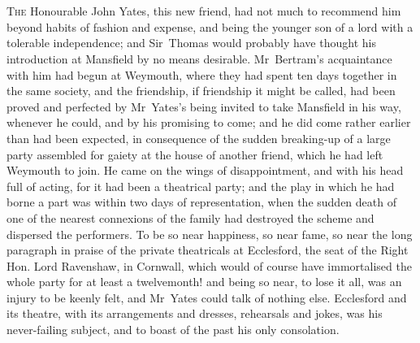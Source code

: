 \chapter[Chapter \thechapter]{} 

 \lettrine[lraise=0.3]{T}{he} Honourable John Yates, this new friend, had not much to recommend him beyond habits of fashion and expense, and being the younger son of a lord with a tolerable independence; and Sir~Thomas would probably have thought his introduction at Mansfield by no means desirable. Mr~Bertram's acquaintance with him had begun at Weymouth, where they had spent ten days together in the same society, and the friendship, if friendship it might be called, had been proved and perfected by Mr~Yates's being invited to take Mansfield in his way, whenever he could, and by his promising to come; and he did come rather earlier than had been expected, in consequence of the sudden breaking-up of a large party assembled for gaiety at the house of another friend, which he had left Weymouth to join. He came on the wings of disappointment, and with his head full of acting, for it had been a theatrical party; and the play in which he had borne a part was within two days of representation, when the sudden death of one of the nearest connexions of the family had destroyed the scheme and dispersed the performers. To be so near happiness, so near fame, so near the long paragraph in praise of the private theatricals at Ecclesford, the seat of the Right Hon. Lord Ravenshaw, in Cornwall, which would of course have immortalised the whole party for at least a twelvemonth! and being so near, to lose it all, was an injury to be keenly felt, and Mr~Yates could talk of nothing else. Ecclesford and its theatre, with its arrangements and dresses, rehearsals and jokes, was his never-failing subject, and to boast of the past his only consolation.

